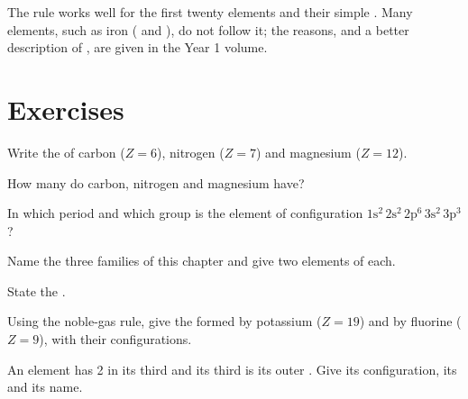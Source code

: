 \begin{remark}\label{rem:g10:electron-shells:limits}
The rule works well for the first twenty elements and their simple .
Many elements, such as iron ( and ), do not
follow it; the reasons, and a better description of , are given
in the Year 1 volume.
\end{remark}

\section{Exercises}

\begin{exercise}[$\star$]\label{exo:g10:electron-shells:1}
Write the  of carbon ($Z = 6$), nitrogen ($Z = 7$)
and magnesium ($Z = 12$).
\end{exercise}

\begin{exercise}[$\star$]\label{exo:g10:electron-shells:2}
How many  do carbon, nitrogen and magnesium have?
\end{exercise}

\begin{exercise}[$\star$]\label{exo:g10:electron-shells:3}
In which period and which group is the element of configuration
$1\mathrm{s}^2\,2\mathrm{s}^2\,2\mathrm{p}^6\,3\mathrm{s}^2\,3\mathrm{p}^3$?
\end{exercise}

\begin{exercise}[$\star$]\label{exo:g10:electron-shells:4}
Name the three families of this chapter and give two elements of each.
\end{exercise}

\begin{exercise}[$\star$]\label{exo:g10:electron-shells:5}
State the .
\end{exercise}

\begin{exercise}[$\star\star$]\label{exo:g10:electron-shells:6}
Using the noble-gas rule, give the  formed by potassium ($Z = 19$) and
by fluorine ($Z = 9$), with their configurations.
\end{exercise}

\begin{exercise}[$\star\star$]\label{exo:g10:electron-shells:7}
An element has 2  in its third  and its third  is its
outer . Give its configuration, its  and its name.
\end{exercise}

